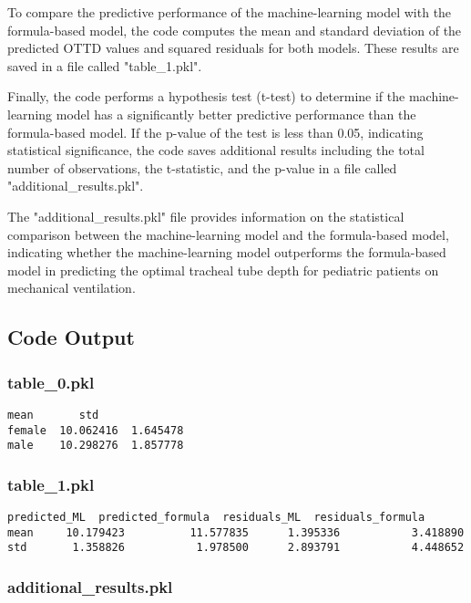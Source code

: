 \documentclass[11pt]{article}
\begin{document}
To compare the predictive performance of the machine-learning model with the formula-based model, the code computes the mean and standard deviation of the predicted OTTD values and squared residuals for both models. These results are saved in a file called "table\_1.pkl".

Finally, the code performs a hypothesis test (t-test) to determine if the machine-learning model has a significantly better predictive performance than the formula-based model. If the p-value of the test is less than 0.05, indicating statistical significance, the code saves additional results including the total number of observations, the t-statistic, and the p-value in a file called "additional\_results.pkl".

The "additional\_results.pkl" file provides information on the statistical comparison between the machine-learning model and the formula-based model, indicating whether the machine-learning model outperforms the formula-based model in predicting the optimal tracheal tube depth for pediatric patients on mechanical ventilation.

\subsection{Code Output}

\subsubsection*{table\_0.pkl}

\begin{Verbatim}[tabsize=4]
             mean       std
female  10.062416  1.645478
male    10.298276  1.857778
\end{Verbatim}

\subsubsection*{table\_1.pkl}

\begin{Verbatim}[tabsize=4]
      predicted_ML  predicted_formula  residuals_ML  residuals_formula
mean     10.179423          11.577835      1.395336           3.418890
std       1.358826           1.978500      2.893791           4.448652
\end{Verbatim}

\subsubsection*{additional\_results.pkl}
\end{document}
